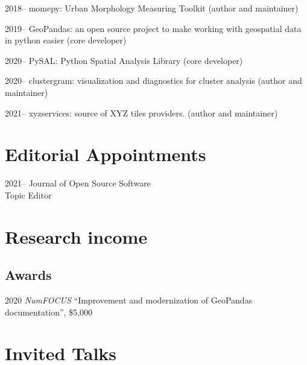\documentclass[12pt,a4paper]{report}
\begin{document}
    \begin{tablist}

        \item[2018--] \tab{}momepy: Urban Morphology Measuring Toolkit (author and maintainer)
        \item[2019--] \tab{}GeoPandas: an open source project to make working with geospatial data in python easier (core developer)
        \item[2020--] \tab{}PySAL: Python Spatial Analysis Library (core developer)
        \item[2020--] \tab{}clustergram: visualization and diagnostics for cluster analysis (author and maintainer)
        \item[2021--] \tab{}xyzservices: source of XYZ tiles providers. (author and maintainer)

    \end{tablist}

    \section*{Editorial Appointments}

    \begin{tablist}

        \item[2021--] \tab{}Journal of Open Source Software \\
                            Topic Editor

    \end{tablist}

    \section*{Research income}

    \subsection*{Awards}

    \begin{tablist}

        \item[2020] \tab{}\textit{NumFOCUS} \enquote{Improvement and modernization of GeoPandas documentation}, \$5,000

    \end{tablist}

    \section*{Invited Talks}
\end{document}
